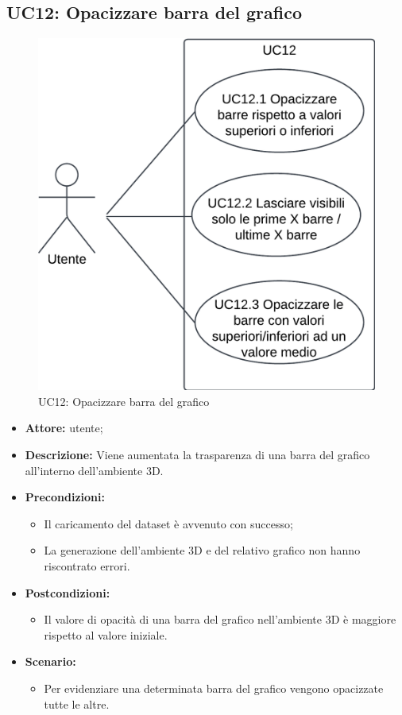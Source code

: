 \subsection{UC12: Opacizzare barra del grafico}
\begin{figure}[h!]\centering
    \includegraphics[scale=0.7]{template/images/UC12.png}
    \caption{UC12: Opacizzare barra del grafico}
\end{figure}
\begin{itemize}    
    \item \textbf{Attore:} utente;
    \item \textbf{Descrizione:} Viene aumentata la trasparenza di una barra del grafico all'interno dell'ambiente 3D.
    \item \textbf{Precondizioni:}    
        \begin{itemize}
            \item Il caricamento del dataset è avvenuto con successo;
            \item La generazione dell'ambiente 3D e del relativo grafico non hanno riscontrato errori.
        \end{itemize}    
    \item \textbf{Postcondizioni:}
        \begin{itemize}
            \item Il valore di opacità di una barra del grafico nell'ambiente 3D è maggiore rispetto al valore iniziale.
        \end{itemize}    
    \item \textbf{Scenario:} 
        \begin{itemize}
            \item Per evidenziare una determinata barra del grafico vengono opacizzate tutte le altre.
        \end{itemize}
\end{itemize}
